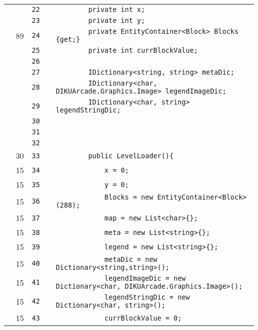 \documentclass[a4paper,landscape,10pt]{article}
\begin{document}
\begin{longtable}[l]{lrrll}
\cellcolor{gray} &  & \verb~22~ & & \verb~        private int x;~\\
\cellcolor{gray} &  & \verb~23~ & & \verb~        private int y;~\\
\cellcolor{green} & 89 & \verb~24~ & & \verb~        private EntityContainer<Block> Blocks {get;}~\\
\cellcolor{gray} &  & \verb~25~ & & \verb~        private int currBlockValue;~\\
\cellcolor{gray} &  & \verb~26~ & & \verb~~\\
\cellcolor{gray} &  & \verb~27~ & & \verb~        IDictionary<string, string> metaDic;~\\
\cellcolor{gray} &  & \verb~28~ & & \verb~        IDictionary<char, DIKUArcade.Graphics.Image> legendImageDic;~\\
\cellcolor{gray} &  & \verb~29~ & & \verb~        IDictionary<char, string> legendStringDic;~\\
\cellcolor{gray} &  & \verb~30~ & & \verb~~\\
\cellcolor{gray} &  & \verb~31~ & & \verb~~\\
\cellcolor{gray} &  & \verb~32~ & & \verb~~\\
\cellcolor{green} & 30 & \verb~33~ & & \verb~        public LevelLoader(){~\\
\cellcolor{green} & 15 & \verb~34~ & & \verb~            x = 0;~\\
\cellcolor{green} & 15 & \verb~35~ & & \verb~            y = 0;~\\
\cellcolor{green} & 15 & \verb~36~ & & \verb~            Blocks = new EntityContainer<Block>(288);~\\
\cellcolor{green} & 15 & \verb~37~ & & \verb~            map = new List<char>{};~\\
\cellcolor{green} & 15 & \verb~38~ & & \verb~            meta = new List<string>{};~\\
\cellcolor{green} & 15 & \verb~39~ & & \verb~            legend = new List<string>{};~\\
\cellcolor{green} & 15 & \verb~40~ & & \verb~            metaDic = new Dictionary<string,string>();~\\
\cellcolor{green} & 15 & \verb~41~ & & \verb~            legendImageDic = new Dictionary<char, DIKUArcade.Graphics.Image>();~\\
\cellcolor{green} & 15 & \verb~42~ & & \verb~            legendStringDic = new Dictionary<char, string>();~\\
\cellcolor{green} & 15 & \verb~43~ & & \verb~            currBlockValue = 0;~\\

\end{longtable}
\end{document}
